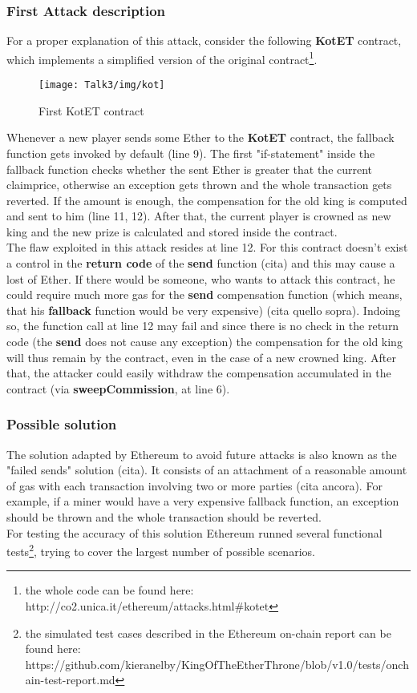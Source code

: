 \subsubsection{First Attack description}
For a proper explanation of this attack, consider the following \textbf{KotET} contract, which implements a simplified version of the original contract\footnote{the whole code can be found here: http://co2.unica.it/ethereum/attacks.html\#kotet}.   
\begin{figure}[H]
\begin{center}
\texttt{[image: Talk3/img/kot]}
\end{center}
\caption{First KotET contract}
\label{label}
\end{figure}
Whenever a new player sends some Ether to the \textbf{KotET} contract, the fallback function gets invoked by default (line 9). The first "if-statement" inside the fallback function checks whether the sent Ether is greater that the current claimprice, otherwise an exception gets thrown and the whole transaction gets reverted. If the amount is enough, the compensation for the old king is computed and sent to him (line 11, 12). After that, the current player is crowned as new king and the new prize is calculated and stored inside the contract\cite{paper2}. \\
The flaw exploited in this attack resides at line 12. For this contract doesn't exist a control in the \textbf{return code} of the \textbf{send} function (cita) %
and this may cause a lost of Ether.
If there would be someone, who wants to attack this contract, he could require much more gas for the \textbf{send} compensation function (which means, that his \textbf{fallback} function would be very expensive) (cita quello sopra). Indoing so, the function call at line 12 may fail and since there is no check in the return code (the \textbf{send} does not cause any exception) the compensation for the old king will thus remain by the contract, even in the case of a new crowned king. 
After that, the attacker could easily withdraw the compensation accumulated in the contract (via \textbf{sweepCommission}, at line 6).  

\subsubsection{Possible solution}
The solution adapted by Ethereum to avoid future attacks is also known as the "failed sends" solution (cita). It consists of an attachment of a reasonable amount of gas with each transaction involving two or more parties (cita ancora). 
For example, if a miner would have a very expensive fallback function, an exception should be thrown and the whole transaction should be reverted. \\ For testing the accuracy of this solution Ethereum runned several functional tests\footnote{the simulated test cases described in the Ethereum on-chain report can be found here: https://github.com/kieranelby/KingOfTheEtherThrone/blob/v1.0/tests/onchain-test-report.md}, trying to cover the largest number of possible scenarios. 


